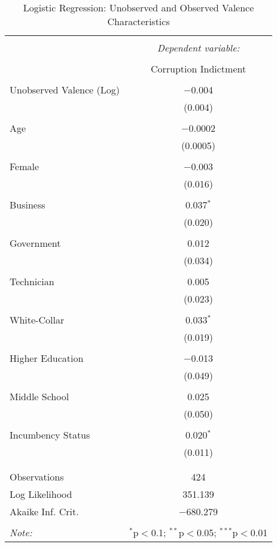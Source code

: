 \documentclass{article}
\begin{document}
\begin{table}[!htbp] \centering 
  \caption{Logistic Regression: Unobserved and Observed Valence Characteristics} 
  \label{} 
\begin{tabular}{@{\extracolsep{5pt}}lc} 
\\[-1.8ex]\hline 
\hline \\[-1.8ex] 
 & \multicolumn{1}{c}{\textit{Dependent variable:}} \\ 
\cline{2-2} 
\\[-1.8ex] & Corruption Indictment \\ 
\hline \\[-1.8ex] 
 Unobserved Valence (Log) & $-$0.004 \\ 
  & (0.004) \\ 
  & \\ 
 Age & $-$0.0002 \\ 
  & (0.0005) \\ 
  & \\ 
 Female & $-$0.003 \\ 
  & (0.016) \\ 
  & \\ 
 Business & 0.037$^{*}$ \\ 
  & (0.020) \\ 
  & \\ 
 Government & 0.012 \\ 
  & (0.034) \\ 
  & \\ 
 Technician & 0.005 \\ 
  & (0.023) \\ 
  & \\ 
 White-Collar & 0.033$^{*}$ \\ 
  & (0.019) \\ 
  & \\ 
 Higher Education & $-$0.013 \\ 
  & (0.049) \\ 
  & \\ 
 Middle School & 0.025 \\ 
  & (0.050) \\ 
  & \\ 
 Incumbency Status & 0.020$^{*}$ \\ 
  & (0.011) \\ 
  & \\ 
\hline \\[-1.8ex] 
Observations & 424 \\ 
Log Likelihood & 351.139 \\ 
Akaike Inf. Crit. & $-$680.279 \\ 
\hline 
\hline \\[-1.8ex] 
\textit{Note:}  & \multicolumn{1}{r}{$^{*}$p$<$0.1; $^{**}$p$<$0.05; $^{***}$p$<$0.01} \\ 
\end{tabular} 
\end{table} 
\end{document}
